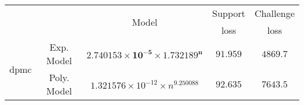 \begin{tabular}{ccccc} 
\hline 
 &  & \multirow{2}{*}{Model} & Support & Challenge\tabularnewline 
 &  &  & loss  & loss\tabularnewline 
\hline 
\hline 
\multirow{2}{*}{dpmc} & Exp. Model & $\mathbf{2.740153\times10^{-5}\times 1.732189^{n}}$ & $\mathbf{91.959}$ & $\mathbf{4869.7}$ \tabularnewline 
 & Poly. Model & $1.321576\times10^{-12}\times n^{9.250088}$ & $92.635$ & $7643.5$ \tabularnewline 
\hline 
\end{tabular} 

